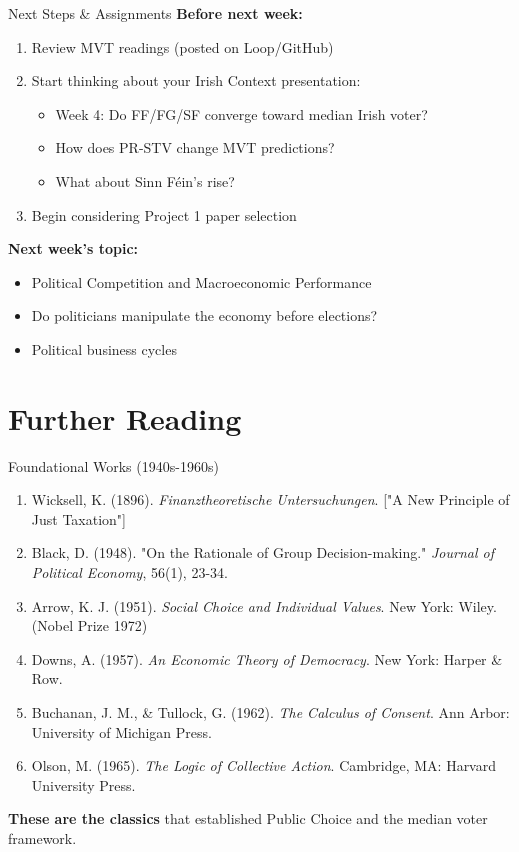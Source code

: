 \documentclass[10pt]{beamer}
\begin{document}
\begin{frame}{Next Steps \& Assignments}
\textbf{Before next week:}
\begin{enumerate}
\item Review MVT readings (posted on Loop/GitHub)
\item Start thinking about your Irish Context presentation:
\begin{itemize}
\item Week 4: Do FF/FG/SF converge toward median Irish voter?
\item How does PR-STV change MVT predictions?
\item What about Sinn Féin's rise?
\end{itemize}
\item Begin considering Project 1 paper selection
\end{enumerate}


\textbf{Next week's topic:}
\begin{itemize}
\item Political Competition and Macroeconomic Performance
\item Do politicians manipulate the economy before elections?
\item Political business cycles
\end{itemize}
\end{frame}



\section*{Further Reading}

\begin{frame}{Foundational Works (1940s-1960s)}
\footnotesize
\begin{enumerate}
\item Wicksell, K. (1896). \emph{Finanztheoretische Untersuchungen}. ["A New Principle of Just Taxation"]
\item Black, D. (1948). "On the Rationale of Group Decision-making." \emph{Journal of Political Economy}, 56(1), 23-34.
\item Arrow, K. J. (1951). \emph{Social Choice and Individual Values}. New York: Wiley. (Nobel Prize 1972)
\item Downs, A. (1957). \emph{An Economic Theory of Democracy}. New York: Harper \& Row.
\item Buchanan, J. M., \& Tullock, G. (1962). \emph{The Calculus of Consent}. Ann Arbor: University of Michigan Press.
\item Olson, M. (1965). \emph{The Logic of Collective Action}. Cambridge, MA: Harvard University Press.
\end{enumerate}


\textbf{These are the classics} that established Public Choice and the median voter framework.
\end{frame}
\end{document}
